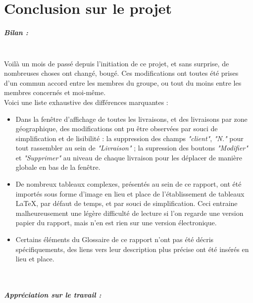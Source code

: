 \documentclass{report}
\begin{document}
\chapter{Conclusion sur le projet}

\paragraph{\textbf{Bilan :}}
~~\\

Voilà un mois de passé depuis l'initiation de ce projet, et sans surprise, de nombreuses choses ont changé, bougé. Ces modifications ont toutes été prises d'un commun accord entre les membres du groupe, ou tout du moins entre les membres concernés et moi-même.\\

Voici une liste exhaustive des différences marquantes : \\

\begin{itemize}
	\item Dans la fenêtre d'affichage de toutes les livraisons, et des livraisons par zone géographique, des modifications ont pu être observées par souci de simplification et de lisibilité : la suppression des champs \textit{"client"}, \textit{"N."} pour tout rassembler au sein de \textit{"Livraison"} ; la supression des boutons \textit{"Modifier"} et \textit{"Supprimer"} au niveau de chaque livraison pour les déplacer de manière globale en bas de la fenêtre.\\
	
	\item De nombreux tableaux complexes, présentés au sein de ce rapport, ont été importés sous forme d'image en lieu et place de l'établissement de tableaux LaTeX, par défaut de temps, et par souci de simplification. Ceci entraine malheureusement une légère difficulté de lecture si l'on regarde une version papier du rapport, mais n'en est rien sur une version électronique.\\
	
	\item Certains éléments du Glossaire de ce rapport n'ont pas été décris spécifiquements, des liens vers leur description plus précise ont été insérés en lieu et place.\\
\end{itemize}

~~\\

\paragraph{\textbf{Appréciation sur le travail :}}
~~\\
\end{document}
